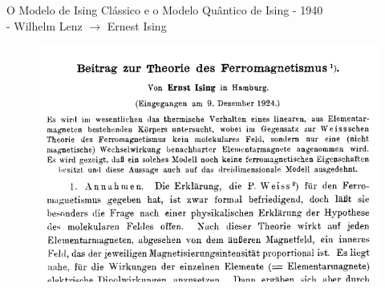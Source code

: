 \documentclass[10pt]{beamer}
\begin{document}
\begin{frame}{O Modelo de Ising Clássico e o Modelo Quântico de Ising}
	- 1940 \\
	- Wilhelm Lenz $\to$ Ernest Ising
	\begin{figure}
		\center
		\includegraphics[scale=.4]{IsingPaper.png}
	\end{figure}
\end{frame}
\end{document}
